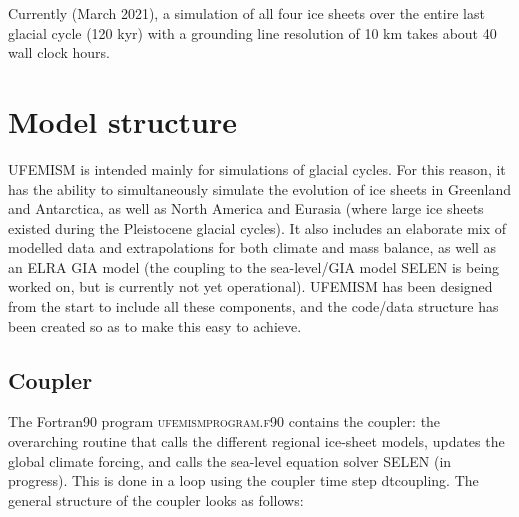 \documentclass{article}
\begin{document}
Currently (March 2021), a simulation of all four ice sheets over the entire last glacial cycle (120 kyr) with a grounding line resolution of 10 km takes about 40 wall clock hours.

\newpage
\section{Model structure}

UFEMISM is intended mainly for simulations of glacial cycles. For this reason, it has the ability to simultaneously simulate the evolution of ice sheets in Greenland and Antarctica, as well as North America and Eurasia (where large ice sheets existed during the Pleistocene glacial cycles). It also includes an elaborate mix of modelled data and extrapolations for both climate and mass balance, as well as an ELRA GIA model (the coupling to the sea-level/GIA model SELEN is being worked on, but is currently not yet operational). UFEMISM has been designed from the start to include all these components, and the code/data structure has been created so as to make this easy to achieve.

\subsection{Coupler}

The Fortran90 program \textsc{ufemism\textunderscore program.f90} contains the coupler: the overarching routine that calls the different regional ice-sheet models, updates the global climate forcing, and calls the sea-level equation solver SELEN (in progress). This is done in a loop using the coupler time step dt\textunderscore coupling. The general structure of the coupler looks as follows:
\end{document}
